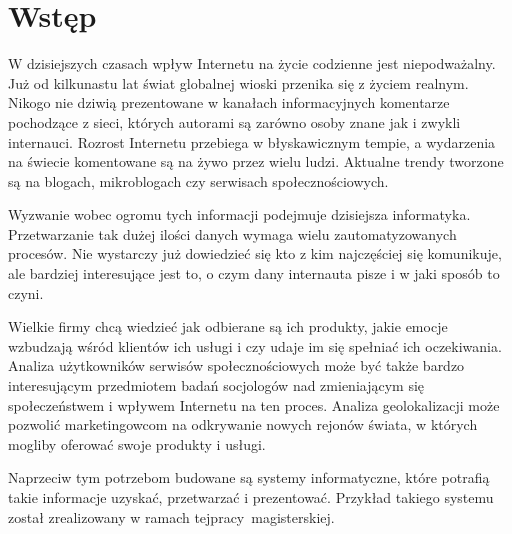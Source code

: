 \chapter{Wstęp}

\begin{comment}
- motywacja, po co to robimy
- state of the art. Jak wyglada dziedzina, ktora sie zajmujemy?
Stosujemy tu metode szybkiego top down z ogolnikow do szczegolow.
Przechodzimy do tematyki, ktora sie zajmujemy. Piszemy co zrobiono precyzyjnie
w danej tematyce. Cytujemy artykuly (ksiazki - won!) Piszemy to w celu ..
- .. zdefiniowania celow pracy
- a potem jak te cele chcemy osiagnac, jakimi metodami
- potem piszemy co bedzie znajdowac sie w kazdym z rodzialow
- i na koncu jaki jest impact pracy
\end{comment}

W dzisiejszych czasach wpływ Internetu na życie codzienne jest niepodważalny.
Już od kilkunastu lat świat globalnej wioski przenika się z życiem realnym.
Nikogo nie dziwią prezentowane w kanałach informacyjnych komentarze
pochodzące z sieci, których autorami są zarówno osoby znane jak i zwykli
internauci. Rozrost Internetu przebiega w błyskawicznym tempie, a wydarzenia na
świecie komentowane są na żywo przez wielu ludzi. Aktualne trendy tworzone są na
blogach, mikroblogach czy serwisach społecznościowych.

Wyzwanie wobec ogromu tych informacji podejmuje dzisiejsza informatyka.
Przetwarzanie tak dużej ilości danych wymaga wielu zautomatyzowanych procesów.
Nie wystarczy już dowiedzieć się kto z kim najczęściej
się komunikuje, ale bardziej interesujące jest to, o czym dany internauta
pisze i w jaki sposób to czyni.

Wielkie firmy chcą wiedzieć jak odbierane są ich produkty, jakie emocje
wzbudzają wśród klientów ich usługi i czy udaje im się spełniać ich oczekiwania.
Analiza użytkowników serwisów społecznościowych może być także bardzo
interesującym przedmiotem badań socjologów nad zmieniającym się społeczeństwem i
wpływem Internetu na ten proces. Analiza geolokalizacji może pozwolić
marketingowcom na odkrywanie nowych rejonów świata, w których mogliby oferować swoje
produkty i usługi.

Naprzeciw tym potrzebom budowane są systemy informatyczne, które potrafią takie
informacje uzyskać, przetwarzać i prezentować. Przykład takiego systemu został
zrealizowany w ramach tej\linebreak pracy~magisterskiej.

